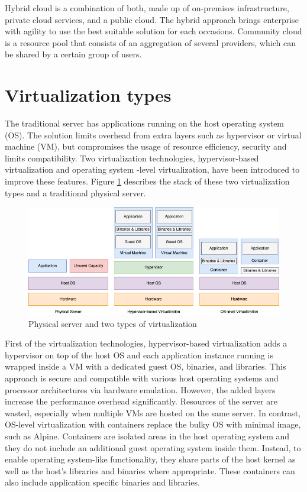 Hybrid cloud is a combination of both, made up of on-premises infrastructure, private cloud services, and a public cloud. The hybrid approach brings enterprise with agility to use the best suitable solution for each occasions. \cite{NetApp} Community cloud is a resource pool that consists of an aggregation of several providers, which can be shared by a certain group of users. \cite{Taleb2017}


\section{Virtualization types}

The traditional server has applications running on the host operating system (OS). The solution limits overhead from extra layers such as hypervisor or virtual machine (VM), but compromises the usage of resource efficiency, security and limits compatibility. Two virtualization technologies, hypervisor-based virtualization and operating system -level virtualization, have been introduced to improve these features. Figure \ref{fig:VirtualizationTypes} describes the stack of these two virtualization types and a traditional physical server.

\begin{figure}[ht]
  \begin{center}
    \includegraphics[width=13.5cm]{images/VirtualizationTypes.png}
    \caption{Physical server and two types of virtualization}
    \label{fig:VirtualizationTypes}
  \end{center}
\end{figure}

First of the virtualization technologies, hypervisor-based virtualization adds a hypervisor on top of the host OS and each application instance running is wrapped inside a VM with a dedicated guest OS, binaries, and libraries. This approach is secure and compatible with various host operating systems and processor architectures via hardware emulation. However, the added layers increase the performance overhead significantly. Resources of the server are wasted, especially when multiple VMs are hosted on the same server. In contrast, OS-level virtualization with containers replace the bulky OS with minimal image, such as Alpine. Containers are isolated areas in the host operating system and they do not include an additional guest operating system inside them. Instead, to enable operating system-like functionality, they share parts of the host kernel as well as the host’s libraries and binaries where appropriate. These containers can also include application specific binaries and libraries. \cite{Toimela2017} 

